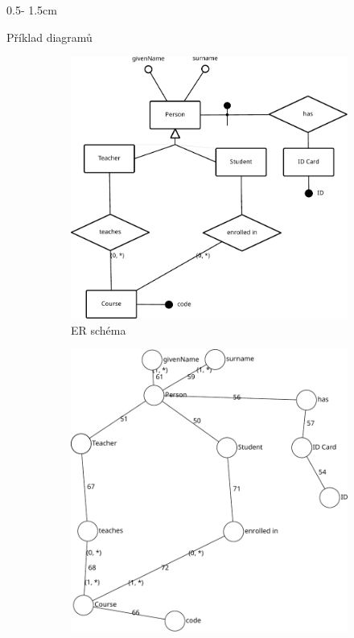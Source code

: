 \documentclass[a0paper]{uioposter}
\begin{document}
\begin{frame}
\begin{columns}[onlytextwidth]
\begin{column}{0.5\textwidth - 1.5cm}
      \begin{block}{Příklad diagramů}
        \begin{figure}
          \centering
          \begin{subfigure}{0.45\textwidth}
            \includegraphics[width=1\textwidth]{./images/university-er.pdf}
            \caption*{ER schéma}
          \end{subfigure}
          \begin{subfigure}{0.45\textwidth}
            \includegraphics[width=\textwidth]{./images/university-schemcat.pdf}

\end{subfigure}
\end{figure}
\end{block}
\end{column}
\end{columns}
\end{frame}
\end{document}
